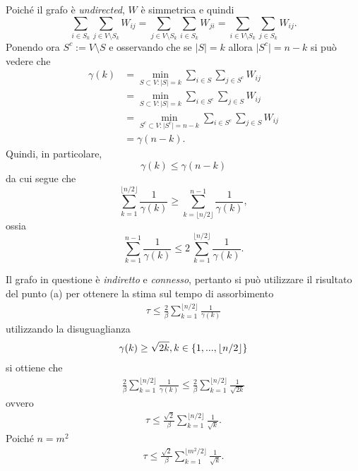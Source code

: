 \begin{alphaparts}
Poiché il grafo è \textit{undirected}, $W$ è simmetrica e quindi
\[\sum_{i\in S_{k}} \sum_{j\in V\setminus S_{k} } W_{ij} =  \sum_{j\in V\setminus S_{k} } \sum_{i\in S_{k}} W_{ji} = \sum_{i\in V\setminus S_{k} } \sum_{j\in S_{k}} W_{ij}. \]
Ponendo ora \( S^{c} := V\setminus S \) e osservando che se \( \vert S \vert = k\) allora \(\vert S^{c} \vert = n-k\) si può vedere che
\begin{align}
\gamma(k) &= \min_{S\subset V : \vert S \vert = k} \sum_{i\in S}\sum_{j\in S^{c}} W_{ij} \nonumber\\
&= \min_{S\subset V : \vert S \vert = k} \sum_{i\in S^{c}}\sum_{j\in S} W_{ij} \nonumber\\
&= \min_{S^{c}\subset V : \vert S^{c} \vert = n - k} \sum_{i\in S^{c}}\sum_{j\in S} W_{ij} \nonumber\\
&= \gamma(n-k). \nonumber
\end{align}
Quindi, in particolare,
\[ \gamma(k) \le \gamma(n-k) \]
da cui segue che
\[\sum_{k = 1}^{\lfloor n/2\rfloor} \frac{1}{\gamma(k)} \ge \sum_{k = \lfloor n/2\rfloor}^{n-1} \frac{1}{\gamma(k)}, \]
ossia
\[\sum_{k = 1}^{n - 1} \frac{1}{\gamma(k)} \le 2\,\sum_{k = 1}^{\lfloor n/2\rfloor} \frac{1}{\gamma(k)}. \]

    \questionpart %
Il grafo in questione è \textit{indiretto} e \textit{connesso}, pertanto si può utilizzare il risultato del punto (a) per ottenere la stima sul tempo di assorbimento 
\begin{align*}
\tau \leq \frac{2}{\beta} \sum_{k=1}^{\lfloor n/2\rfloor} \frac{1}{\gamma(k)}
\end{align*}
utilizzando la disuguaglianza
\begin{align*}
\gamma(k) \geq \sqrt{2k}, \vspace{0.5cm} k \in \{1,...,\lfloor n/2\rfloor \}
\end{align*}
si ottiene che 
\begin{align*}
\frac{2}{\beta} \sum_{k=1}^{\lfloor n/2\rfloor} \frac{1}{\gamma(k)} \leq \frac{2}{\beta} \sum_{k=1}^{\lfloor n/2\rfloor} \frac{1}{\sqrt{2k}}
\end{align*}
ovvero
\begin{align*}
\tau \leq \frac{\sqrt{2}}{\beta} \sum_{k=1}^{\lfloor n/2\rfloor} \frac{1}{\sqrt{k}}.
\end{align*}
Poiché $n=m^2$
\begin{align*}
\tau \leq \frac{\sqrt{2}}{\beta} \sum_{k=1}^{\lfloor m^2/2\rfloor} \frac{1}{\sqrt{k}}.
\end{align*}


\end{alphaparts}
